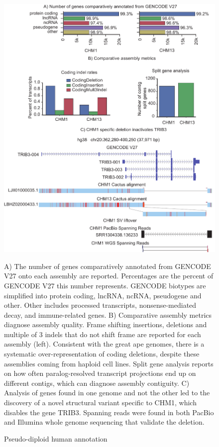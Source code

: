 \documentclass[fleqn,10pt]{wlscirep}
\begin{document}
\begin{figure}
\centering
\includegraphics[width=\textwidth,height=0.7\textheight,keepaspectratio]{figure3-human-v2.pdf}
\caption{Pseudo-diploid human annotation}
A) The number of genes comparatively annotated from GENCODE V27 onto each assembly are reported. Percentages are the percent of GENCODE V27 this number represents. GENCODE biotypes are simplified into protein coding, lncRNA, ncRNA, pseudogene and other. Other includes processed transcripts, nonsense-mediated decay, and immune-related genes. B) Comparative assembly metrics diagnose assembly quality. Frame shifting insertions, deletions and multiple of 3 indels that do not shift frame are reported for each assembly (left). Consistent with the great ape genomes, there is a systematic over-representation of coding deletions, despite these assemblies coming from haploid cell lines. Split gene analysis reports on how often paralog-resolved transcript projections end up on different contigs, which can diagnose assembly contiguity. C) Analysis of genes found in one genome and not the other led to the discovery of a novel structural variant specific to CHM1, which disables the gene TRIB3. Spanning reads were found in both PacBio and Illumina whole genome sequencing that validate the deletion.
\label{fig:fig3}
\end{figure}
\end{document}
